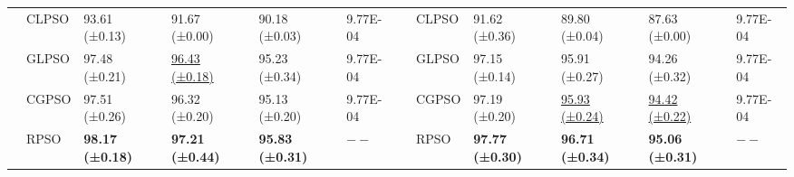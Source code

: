 \documentclass[review]{elsarticle}
\begin{document}
\begin{table}
\begin{adjustwidth}{-4.2cm}{}
{\begin{tabular}{l|lllll|c|lllll}
			& CLPSO  & 93.61 (±0.13)  & 91.67 (±0.00)  & 90.18 (±0.03)  &9.77E-04   & &CLPSO  & 91.62 (±0.36)  & 89.80 (±0.04)  & 87.63 (±0.00)&9.77E-04    \\
			& GLPSO  & 97.48 (±0.21)  & \underline{96.43 (±0.18)}  & 95.23 (±0.34)  &9.77E-04    & &GLPSO  & 97.15 (±0.14)  & 95.91 (±0.27)  & 94.26 (±0.32) &9.77E-04   \\
			& CGPSO  & 97.51 (±0.26)  & 96.32 (±0.20)  & 95.13 (±0.20)  &9.77E-04    & &CGPSO  & 97.19 (±0.20)  & \underline{95.93 (±0.24)}  & \underline{94.42 (±0.22)}&9.77E-04    \\
			& RPSO  &\textbf{98.17 (±0.18)}  &\textbf{97.21 (±0.44)}  & 	\textbf{95.83 (±0.31)}  & \quad$--$     & &RPSO  & \textbf{97.77 (±0.30)}  & \textbf{96.71 (±0.34)}  & \textbf{95.06 (±0.31)} &\quad$--$    \\\hline
			

\end{tabular}}
\end{adjustwidth}
\end{table}
\end{document}
